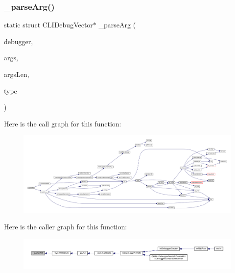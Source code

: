 \subsubsection{\texorpdfstring{\+\_\+parse\+Arg()}{\_parseArg()}}
{\footnotesize\ttfamily static struct C\+L\+I\+Debug\+Vector$\ast$ \+\_\+parse\+Arg (\begin{DoxyParamCaption}\item[{struct C\+L\+I\+Debugger $\ast$}]{debugger,  }\item[{const char $\ast$}]{args,  }\item[{size\+\_\+t}]{args\+Len,  }\item[{char}]{type }\end{DoxyParamCaption})\hspace{0.3cm}{\ttfamily [static]}}

Here is the call graph for this function\+:
\nopagebreak
\begin{figure}[H]
\begin{center}
\leavevmode
\includegraphics[width=350pt]{debugger_2cli-debugger_8c_a5fda3702140fba9e4cc65c283462e28b_cgraph}
\end{center}
\end{figure}
Here is the caller graph for this function\+:
\nopagebreak
\begin{figure}[H]
\begin{center}
\leavevmode
\includegraphics[width=350pt]{debugger_2cli-debugger_8c_a5fda3702140fba9e4cc65c283462e28b_icgraph}
\end{center}
\end{figure}
\mbox{\label{debugger_2cli-debugger_8c_a27934628b83d6ccd96e46e1765075a98}} 
